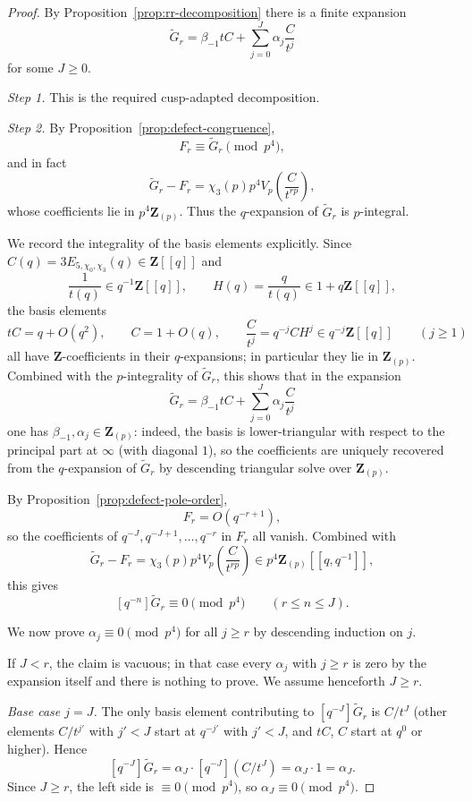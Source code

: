 \documentclass[11pt]{amsart}
\theoremstyle{remark}
\newcommand{\Z}{\mathbf{Z}}
\begin{document}
\begin{proof}
By Proposition~\ref{prop:rr-decomposition} there is a finite expansion
\[
\widetilde G_r=\beta_{-1}tC+\sum_{j=0}^{J}\alpha_j\frac{C}{t^j}
\]
for some $J\ge0$.

\emph{Step 1.} This is the required cusp-adapted decomposition.

\emph{Step 2.} By Proposition~\ref{prop:defect-congruence},
\[
F_r\equiv \widetilde G_r \pmod{p^4},
\]
and in fact
\[
\widetilde G_r-F_r=\chi_3(p)p^4V_p\!\left(\frac{C}{t^{rp}}\right),
\]
whose coefficients lie in $p^4\Z_{(p)}$. Thus the $q$-expansion of $\widetilde G_r$ is $p$-integral.

We record the integrality of the basis elements explicitly. Since $C(q)=3E_{5,\chi_0,\chi_3}(q)\in\Z[[q]]$
and
\[
\frac{1}{t(q)}\in q^{-1}\Z[[q]],
\qquad
H(q)=\frac{q}{t(q)}\in 1+q\Z[[q]],
\]
the basis elements
\[
tC=q+O(q^2),\qquad C=1+O(q),\qquad \frac{C}{t^j}=q^{-j}CH^j\in q^{-j}\Z[[q]]
\qquad (j\ge1)
\]
all have $\Z$-coefficients in their $q$-expansions; in particular they lie in $\Z_{(p)}$.
Combined with the $p$-integrality of $\widetilde G_r$, this shows that in the expansion
\[
\widetilde G_r=\beta_{-1}tC+\sum_{j=0}^{J}\alpha_j\frac{C}{t^j}
\]
one has $\beta_{-1},\alpha_j\in\Z_{(p)}$: indeed, the basis is lower-triangular with respect to the
principal part at $\infty$ (with diagonal $1$), so the coefficients are uniquely recovered from the
$q$-expansion of $\widetilde G_r$ by descending triangular solve over $\Z_{(p)}$.

By Proposition~\ref{prop:defect-pole-order},
\[
F_r=O(q^{-r+1}),
\]
so the coefficients of $q^{-J},q^{-J+1},\ldots,q^{-r}$ in $F_r$ all vanish. Combined with
\[
\widetilde G_r-F_r=\chi_3(p)p^4V_p\!\left(\frac{C}{t^{rp}}\right)\in p^4\Z_{(p)}[[q,q^{-1}]],
\]
this gives
\[
[q^{-n}]\widetilde G_r\equiv 0\pmod{p^4}
\qquad (r\le n\le J).
\]

We now prove $\alpha_j\equiv0\pmod{p^4}$ for all $j\ge r$ by descending induction on $j$.

If $J<r$, the claim is vacuous; in that case every $\alpha_j$ with $j\ge r$ is zero by the expansion
itself and there is nothing to prove. We assume henceforth $J\ge r$.

\emph{Base case $j=J$.} The only basis element contributing to $[q^{-J}]\widetilde G_r$ is $C/t^J$
(other elements $C/t^{j'}$ with $j'<J$ start at $q^{-j'}$ with $j'<J$, and $tC$, $C$ start at
$q^0$ or higher). Hence
\[
[q^{-J}]\widetilde G_r=\alpha_J\cdot[q^{-J}](C/t^J)=\alpha_J\cdot 1=\alpha_J.
\]
Since $J\ge r$, the left side is $\equiv0\pmod{p^4}$, so $\alpha_J\equiv0\pmod{p^4}$.


\end{proof}
\end{document}
